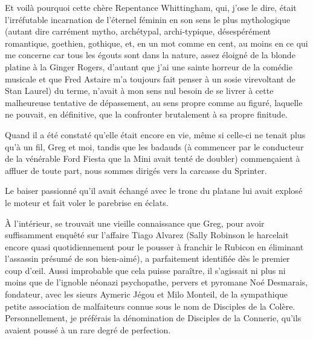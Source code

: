 Et voilà pourquoi cette chère Repentance Whittingham, qui, j’ose le dire, était l’irréfutable incarnation de l’éternel féminin en son sens le plus mythologique (autant dire carrément mytho, archétypal, archi-typique, désespérément romantique, goethien, gothique, et, en un mot comme en cent, au moins en ce qui me concerne car tous les égouts sont dans la nature, assez éloigné de la blonde platine à la Ginger Rogers, d’autant que j’ai une sainte horreur de la comédie musicale et que Fred Astaire m’a toujours fait penser à un sosie virevoltant de Stan Laurel) du terme, n’avait à mon sens nul besoin de se livrer à cette malheureuse tentative de dépassement, au sens propre comme au figuré, laquelle ne pouvait, en définitive, que la confronter brutalement à sa propre finitude.

Quand il a été constaté qu’elle était encore en vie, même si celle-ci ne tenait plus qu’à un fil, Greg et moi, tandis que les badauds (à commencer par le conducteur de la vénérable Ford Fiesta que la Mini avait tenté de doubler) commençaient à affluer de toute part, nous sommes dirigés vers la carcasse du Sprinter.

Le baiser passionné qu’il avait échangé avec le tronc du platane lui avait explosé le moteur et fait voler le parebrise en éclats.

À l’intérieur, se trouvait une vieille connaissance que Greg, pour avoir suffisamment enquêté sur l’affaire Tiago Alvarez (Sally Robinson le harcelait encore quasi quotidiennement pour le pousser à franchir le Rubicon en éliminant l’assassin présumé de son bien-aimé), a parfaitement identifiée dès le premier coup d’œil. Aussi improbable que cela puisse paraître, il s’agissait ni plus ni moins que de l’ignoble néonazi psychopathe, pervers et pyromane Noé Desmarais, fondateur, avec les sieurs Aymeric Jégou et Milo Monteil, de la sympathique petite association de malfaiteurs connue sous le nom de Disciples de la Colère. Personnellement, je préférais la dénomination de Disciples de la Connerie, qu’ils avaient poussé à un rare degré de perfection.

